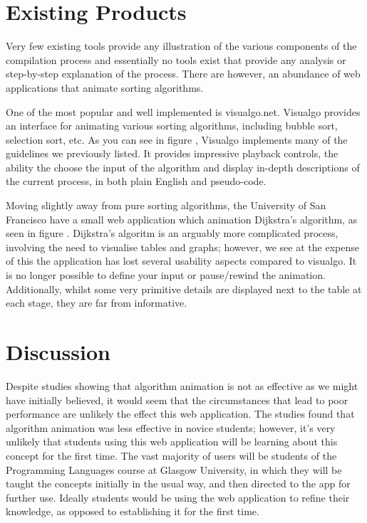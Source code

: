 \documentclass{l4proj}
\begin{document}
\section{Existing Products}
Very few existing tools provide any illustration of the various components of the compilation process and essentially no tools exist that provide any analysis or step-by-step explanation of the process. There are however, an abundance of web applications that animate sorting algorithms. 

One of the most popular and well implemented is visualgo.net. Visualgo provides an interface for animating various sorting algorithms, including bubble sort, selection sort, etc. As you can see in figure , Visualgo implements many of the guidelines we previously listed. It provides impressive playback controls, the ability the choose the input of the algorithm and display in-depth descriptions of the current process, in both plain English and pseudo-code. 

Moving slightly away from pure sorting algorithms, the University of San Francisco have a small web application which animation Dijkstra's algorithm, as seen in figure . Dijkstra's algoritm is an arguably more complicated process, involving the need to visualise tables and graphs; however, we see at the expense of this the application has lost several usability aspects compared to visualgo. It is no longer possible to define your input or pause/rewind the animation. Additionally, whilst some very primitive details are displayed next to the table at each stage, they are far from informative. 

\section{Discussion}
Despite studies showing that algorithm animation is not as effective as we might have initially believed, it would seem that the circumstances that lead to poor performance are unlikely the effect this web application. The studies found that algorithm animation was less effective in novice students; however, it's very unlikely that students using this web application will be learning about this concept for the first time. The vast majority of users will be students of the Programming Languages course at Glasgow University, in which they will be taught the concepts initially in the usual way, and then directed to the app for further use. Ideally students would be using the web application to refine their knowledge, as opposed to establishing it for the first time.
\end{document}
